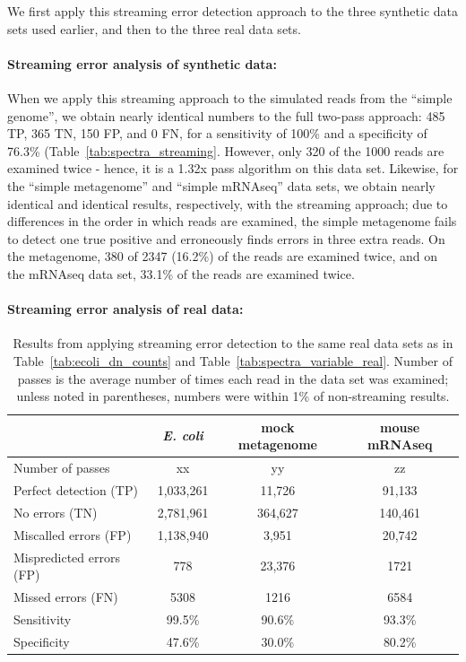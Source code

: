 \documentclass{article}
\begin{document}
We first apply this streaming error detection approach to the three
synthetic data sets used earlier, and then to the three real data sets.

\paragraph{Streaming error analysis of synthetic data:}

When we apply this streaming approach to the simulated reads from the
``simple genome'', we obtain nearly identical numbers to the full
two-pass approach: 485 TP, 365 TN, 150 FP, and 0 FN, for a sensitivity
of 100\% and a specificity of 76.3\%
(Table~\ref{tab:spectra_streaming}.  However, only 320 of the 1000
reads are examined twice - hence, it is a 1.32x pass algorithm on this
data set.  Likewise, for the ``simple metagenome'' and ``simple
mRNAseq'' data sets, we obtain nearly identical and identical results,
respectively, with the streaming approach; due to differences in the
order in which reads are examined, the simple metagenome fails to
detect one true positive and erroneously finds errors in three extra
reads.  On the metagenome, 380 of 2347 (16.2\%) of the reads are
examined twice, and on the mRNAseq data set, 33.1\% of the reads are
examined twice.

\paragraph{Streaming error analysis of real data:}




\begin{table}
\begin{tabular}{|l|c||c||c|}
\hline
& {\em E. coli} & mock metagenome & mouse mRNAseq \\
\hline
Number of passes & xx & yy & zz \\
\hline
Perfect detection (TP)   & 1,033,261 & 11,726  & 91,133 \\
No errors (TN)           & 2,781,961 & 364,627 & 140,461 \\
Miscalled errors (FP)    & 1,138,940 & 3,951   & 20,742 \\
Mispredicted errors (FP) & 778       & 23,376  & 1721 \\
Missed errors (FN)       & 5308      & 1216    & 6584 \\
\hline
Sensitivity            & 99.5\%      & 90.6\%  & 93.3\% \\
Specificity            & 47.6\%      & 30.0\%  &  80.2\% \\
\hline
\end{tabular}
\caption{Results from applying streaming error detection to the same
  real data sets as in Table~\ref{tab:ecoli_dn_counts} and
  Table~\ref{tab:spectra_variable_real}.  Number of passes is the average
  number of times each read in the data set was examined; unless noted in
  parentheses, numbers were within 1\% of non-streaming results.}
\label{tab:spectra_streaming_real}

\end{table}
\end{document}
